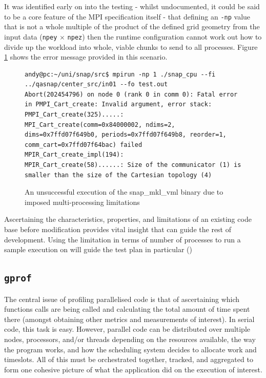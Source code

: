 \documentclass[conference]{IEEEtran}
\begin{document}
It was identified early on into the testing - whilst undocumented, it could be said to be a core feature of the MPI specification itself - that defining an \texttt{-np} value that is not a whole multiple of the product of the defined grid geometry from the input data (\texttt{npey} $ \times $ \texttt{npez}) then the runtime configuration cannot work out how to divide up the workload into whole, viable chunks to send to all processes. Figure \ref{fig:snap-unsuccessful-run} shows the error message provided in this scenario.

\begin{figure}[h]
    \centering
    \begin{lstlisting}[breaklines]
andy@pc:~/uni/snap/src$ mpirun -np 1 ./snap_cpu --fi ../qasnap/center_src/in01 --fo test.out
Abort(202454796) on node 0 (rank 0 in comm 0): Fatal error in PMPI_Cart_create: Invalid argument, error stack:
PMPI_Cart_create(325).....: MPI_Cart_create(comm=0x84000002, ndims=2, dims=0x7ffd07f649b0, periods=0x7ffd07f649b8, reorder=1, comm_cart=0x7ffd07f64bac) failed
MPIR_Cart_create_impl(194): 
MPIR_Cart_create(58)......: Size of the communicator (1) is smaller than the size of the Cartesian topology (4)
    \end{lstlisting}
    \caption{An unsuccessful execution of the snap\_mkl\_vml binary due to imposed multi-processing limitations}
    \label{fig:snap-unsuccessful-run}
\end{figure}

Ascertaining the characteristics, properties, and limitations of an existing code base before modification provides vital insight that can guide the rest of development. Using the limitation in terms of number of processes to run a sample execution on will guide the test plan in particular ()


\subsection{\texttt{gprof}}

The central issue of profiling parallelised code is that of ascertaining which functions calls are being called and calculating the total amount of time spent there (amongst obtaining other metrics and measurements of interest). In serial code, this task is easy. However, parallel code can be distributed over multiple nodes, processors, and/or threads depending on the resources available, the way the program works, and how the scheduling system decides to allocate work and timeslots. All of this must be orchestrated together, tracked, and aggregated to form one cohesive picture of what the application did on the execution of interest.
\end{document}
